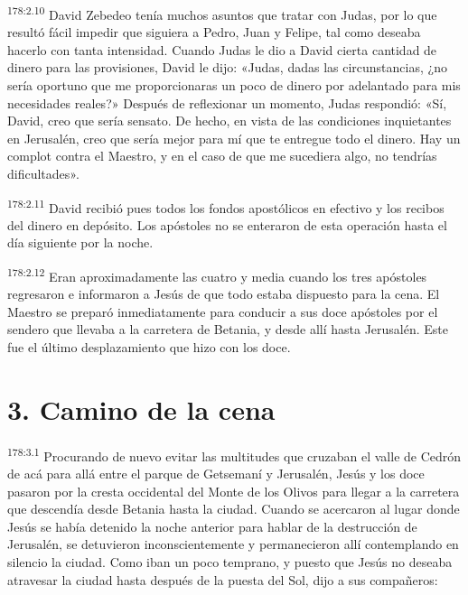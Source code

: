 \par
\textsuperscript{178:2.10} David Zebedeo tenía muchos asuntos que tratar con Judas, por lo que resultó fácil impedir que siguiera a Pedro, Juan y Felipe, tal como deseaba hacerlo con tanta intensidad. Cuando Judas le dio a David cierta cantidad de dinero para las provisiones, David le dijo: «Judas, dadas las circunstancias, ¿no sería oportuno que me proporcionaras un poco de dinero por adelantado para mis necesidades reales?» Después de reflexionar un momento, Judas respondió: «Sí, David, creo que sería sensato. De hecho, en vista de las condiciones inquietantes en Jerusalén, creo que sería mejor para mí que te entregue todo el dinero. Hay un complot contra el Maestro, y en el caso de que me sucediera algo, no tendrías dificultades».

\par
\textsuperscript{178:2.11} David recibió pues todos los fondos apostólicos en efectivo y los recibos del dinero en depósito. Los apóstoles no se enteraron de esta operación hasta el día siguiente por la noche.

\par
\textsuperscript{178:2.12} Eran aproximadamente las cuatro y media cuando los tres apóstoles regresaron e informaron a Jesús de que todo estaba dispuesto para la cena. El Maestro se preparó inmediatamente para conducir a sus doce apóstoles por el sendero que llevaba a la carretera de Betania, y desde allí hasta Jerusalén. Este fue el último desplazamiento que hizo con los doce.

\section*{3. Camino de la cena}
\par
\textsuperscript{178:3.1} Procurando de nuevo evitar las multitudes que cruzaban el valle de Cedrón de acá para allá entre el parque de Getsemaní y Jerusalén, Jesús y los doce pasaron por la cresta occidental del Monte de los Olivos para llegar a la carretera que descendía desde Betania hasta la ciudad. Cuando se acercaron al lugar donde Jesús se había detenido la noche anterior para hablar de la destrucción de Jerusalén, se detuvieron inconscientemente y permanecieron allí contemplando en silencio la ciudad. Como iban un poco temprano, y puesto que Jesús no deseaba atravesar la ciudad hasta después de la puesta del Sol, dijo a sus compañeros:

